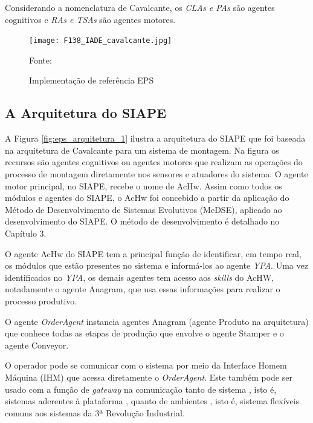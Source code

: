 	 	  Considerando a nomenclatura de Cavalcante, os \textit{CLAs e PAs} são agentes cognitivos e \textit{RAs e TSAs} são agentes motores.
 	 	  
 	 	  \begin{figure}
 	 	  	\centering
 	 	  	\texttt{[image: F138\_IADE\_cavalcante.jpg]} 
 	 	  	\caption{Implementação de referência EPS}
 	 	  	\footnotesize{Fonte: \cite{CAVALCANTE2012a}}
 	 	  	\label{F138}
 	 	  \end{figure}	 


  \subsection{A Arquitetura do SIAPE}


A Figura \ref{fig:eps_arquitetura_1} ilustra a arquitetura do SIAPE que foi baseada na arquitetura de Cavalcante para um sistema de montagem. Na figura os recursos são agentes cognitivos ou agentes motores que realizam as operações do processo de montagem diretamente nos sensores e atuadores do sistema. O agente motor principal, no SIAPE, recebe o nome de AcHw. Assim como todos os módulos e agentes do SIAPE, o AcHw foi concebido a partir da aplicação do Método de Desenvolvimento de Sistemas Evolutivos (MeDSE), aplicado ao desenvolvimento do SIAPE. O método de desenvolvimento é detalhado no Capítulo 3.

O agente AcHw do SIAPE  tem a principal função de identificar, em tempo real, os módulos que estão presentes no  sistema e informá-los ao agente  \textit{YPA}. Uma vez identificados no \textit{YPA}, os demais agentes tem acesso aos \textit{skills} do AcHW, notadamente o agente Anagram, que usa essas informações para realizar o processo produtivo. 

O agente \textit{OrderAgent} instancia agentes Anagram (agente Produto na arquitetura) que conhece todas as etapas de produção que envolve o agente Stamper e o agente Conveyor. 

O operador pode se comunicar com o sistema por meio da Interface Homem Máquina (IHM) que acessa diretamente o \textit{OrderAgent}. Este também pode ser usado com a função de \textit{gateway} na comunicação tanto de sistema \iQuatroZero, isto é, sistemas aderentes à plataforma \iQuatroZero, quanto de ambientes \iTresZero, isto é, sistema flexíveis comuns aos sistemas da 3ª Revolução Industrial.


